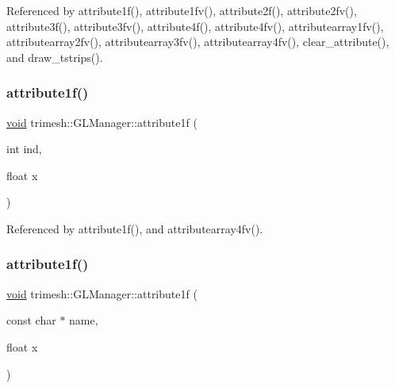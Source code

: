Referenced by attribute1f(), attribute1fv(), attribute2f(), attribute2fv(), attribute3f(), attribute3fv(), attribute4f(), attribute4fv(), attributearray1fv(), attributearray2fv(), attributearray3fv(), attributearray4fv(), clear\+\_\+attribute(), and draw\+\_\+tstrips().

\mbox{\label{classtrimesh_1_1GLManager_ad5384d68b5d1b31e937829fb29e19077}} 
\subsubsection{\texorpdfstring{attribute1f()}{attribute1f()}\hspace{0.1cm}{\footnotesize\ttfamily [1/2]}}
{\footnotesize\ttfamily \hyperlink{namespacetrimesh_a784ddfd979e1c579bda795a8edfc3f43}{void} trimesh\+::\+G\+L\+Manager\+::attribute1f (\begin{DoxyParamCaption}\item[{int}]{ind,  }\item[{float}]{x }\end{DoxyParamCaption})}



Referenced by attribute1f(), and attributearray4fv().

\mbox{\label{classtrimesh_1_1GLManager_a7372a3b621ced01c045e13c0180debc2}} 
\subsubsection{\texorpdfstring{attribute1f()}{attribute1f()}\hspace{0.1cm}{\footnotesize\ttfamily [2/2]}}
{\footnotesize\ttfamily \hyperlink{namespacetrimesh_a784ddfd979e1c579bda795a8edfc3f43}{void} trimesh\+::\+G\+L\+Manager\+::attribute1f (\begin{DoxyParamCaption}\item[{const char $\ast$}]{name,  }\item[{float}]{x }\end{DoxyParamCaption})\hspace{0.3cm}{\ttfamily [inline]}}

